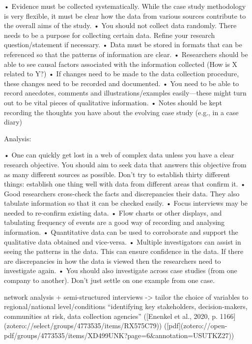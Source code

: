 •	 Evidence must be collected systematically. While the case study methodology is
very flexible, it must be clear how the data from various sources contribute to the
overall aims of the study.
•	 You should not collect data randomly. There needs to be a purpose for collecting
certain data. Refine your research question/statement if necessary.
•	 Data must be stored in formats that can be referenced so that the patterns of
information are clear.
•	 Researchers should be able to see causal factors associated with the information
collected (How is X related to Y?)
•	 If changes need to be made to the data collection procedure, these changes need to
be recorded and documented.
•	 You need to be able to record anecdotes, comments and illustrations/examples
easily—these might turn out to be vital pieces of qualitative information.
•	 Notes should be kept recording the thoughts you have about the evolving case
study (e.g., in a case diary)

Analysis:

•	 One can quickly get lost in a web of complex data unless you have a clear research
objective. You should aim to seek data that answers this objective from as many
different sources as possible. Don’t try to establish thirty different things: establish
one thing well with data from different areas that confirm it.
•	 Good researchers cross-check the facts and discrepancies their data. They also
tabulate information so that it can be checked easily.
•	 Focus interviews may be needed to re-confirm existing data.
•	 Flow charts or other displays, and tabulating frequency of events are a good way of
recording and analysing information.
•	 Quantitative data can be used to corroborate and support the qualitative data
obtained and vice-versa.
•	 Multiple investigators can assist in seeing the patterns in the data. This can ensure
confidence in the data. If there are discrepancies in how the data is viewed then the
researchers need to investigate again.
•	 You should also investigate across case studies (from one company to another).
Don’t just settle on one example from one case.


network analysis + semi-structured interviews -> tailor the choice of variables to regional/national level/conditions “identifying key stakeholders, decision-makers, communities at risk, data collection agencies” ([Enenkel et al., 2020, p. 1166](zotero://select/groups/4773535/items/RX575C79)) ([pdf](zotero://open-pdf/groups/4773535/items/XD499UNK?page=6&annotation=USUTKZ27))



